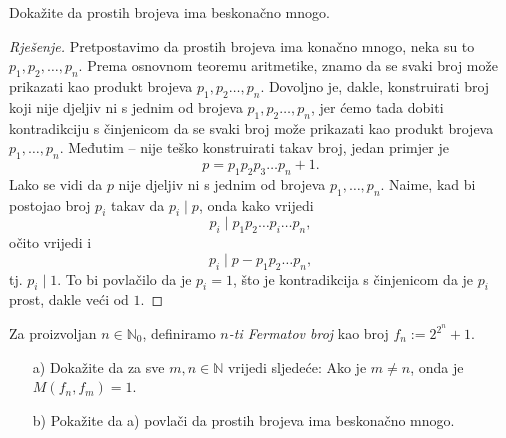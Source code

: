 \begin{exercise}
Dokažite da prostih brojeva ima beskonačno mnogo.
\end{exercise}
\begin{proof}[Rješenje]
Pretpostavimo da prostih brojeva ima konačno mnogo, neka su to $p_1, p_2, \dots, p_n$. Prema osnovnom teoremu aritmetike, znamo da se svaki broj može prikazati kao produkt brojeva $p_1, p_2\dots, p_n$. Dovoljno je, dakle, konstruirati broj koji nije djeljiv ni s jednim od brojeva $p_1, p_2\dots, p_n$, jer ćemo tada dobiti kontradikciju s činjenicom da se svaki broj može prikazati kao produkt brojeva $p_1, \dots, p_n$. Međutim -- nije teško konstruirati takav broj, jedan primjer je
$$p=p_1p_2p_3\dots p_n+1.$$
Lako se vidi da $p$ nije djeljiv ni s jednim od brojeva $p_1,\dots, p_n$. Naime, kad bi postojao broj $p_i$ takav da $p_i\; |\; p$, onda kako vrijedi $$p_i \; |\; p_1p_2\dots p_i\dots p_n,$$ očito vrijedi i $$p_i\; |\; p-p_1p_2\dots p_n,$$ tj. $p_i\; |\; 1$. To bi povlačilo da je $p_i=1$, što je kontradikcija s činjenicom da je $p_i$ prost, dakle veći od $1$.
\end{proof}
\begin{exercise}
Za proizvoljan $n\in \mathbb{N}_0$, definiramo \textit{$n$-ti Fermatov broj} kao broj $f_n:=2^{2^n}+1$.
\begin{itemize}
\item[a)] Dokažite da za sve $m, n\in \mathbb{N}$ vrijedi sljedeće: Ako je $m\neq n$, onda je $M(f_n, f_m)=1$.
\item[b)] Pokažite da a) povlači da prostih brojeva ima beskonačno mnogo.
\end{itemize}
\end{exercise}
